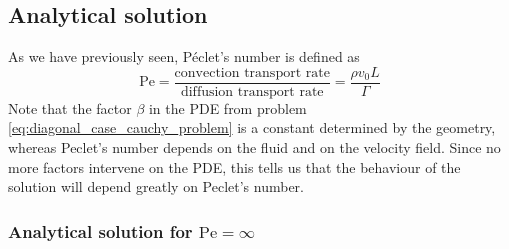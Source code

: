 
\subsection{Analytical solution}

As we have previously seen, Péclet's number is defined as
\begin{equation}
	\mathrm{Pe} = 
	\frac{\text{convection transport rate}}{\text{diffusion transport rate}} = 
	\frac{\rho v_0 L}{\Gamma}
\end{equation}
Note that the factor $\beta$ in the PDE from problem
\eqref{eq:diagonal_case_cauchy_problem} is a constant determined by the
geometry, whereas Peclet's number depends on the fluid and on the velocity
field. Since no more factors intervene on the PDE, this tells us that the
behaviour of the solution will depend greatly on Peclet's number. 

\subsubsection{Analytical solution for \texorpdfstring{$\mathrm{Pe} =
\infty$}{infinite Péclet's number}}

